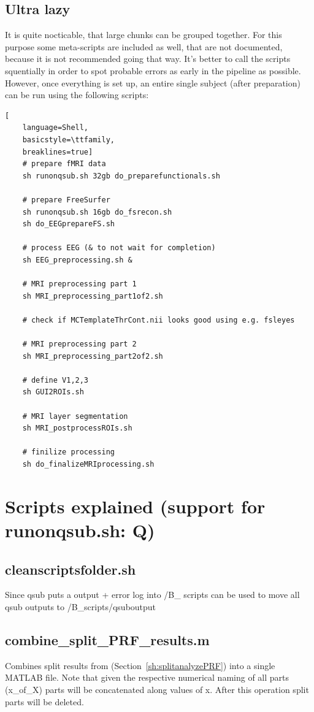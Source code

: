\documentclass[12pt,a4paper]{scrartcl}
\begin{document}
\subsection{Ultra lazy}
It is quite nocticable, that large chunks can be grouped together. For this purpose some meta-scripts are included as well, that are not documented, because it is not recommended going that way. It's better to call the scripts squentially in order to spot probable errors as early in the pipeline as possible. However, once everything is set up, an entire single subject (after preparation) can be run using the following scripts:
\begin{lstlisting}[
    language=Shell,
    basicstyle=\ttfamily,
    breaklines=true]
    # prepare fMRI data
    sh runonqsub.sh 32gb do_preparefunctionals.sh

    # prepare FreeSurfer
    sh runonqsub.sh 16gb do_fsrecon.sh
    sh do_EEGprepareFS.sh

    # process EEG (& to not wait for completion)
    sh EEG_preprocessing.sh &

    # MRI preprocessing part 1
    sh MRI_preprocessing_part1of2.sh

    # check if MCTemplateThrCont.nii looks good using e.g. fsleyes

    # MRI preprocessing part 2
    sh MRI_preprocessing_part2of2.sh

    # define V1,2,3
    sh GUI2ROIs.sh

    # MRI layer segmentation
    sh MRI_postprocessROIs.sh

    # finilize processing
    sh do_finalizeMRIprocessing.sh
\end{lstlisting}
\FloatBarrier

\section{Scripts explained (support for runonqsub.sh: Q)}
\label{sec:scriptsExplained}
\subsection{cleanscriptsfolder.sh}
\label{sh:clean}
Since qsub puts a output + error log into /B\_ scripts \texttt{} can be used to move all qsub outputs to /B\_scripts/qsuboutput\\

\subsection{combine\_split\_PRF\_results.m}
\label{m:combsplt}
Combines split results from \texttt{} (Section~\ref{sh:splitanalyzePRF}) into a single MATLAB file. Note that given the respective numerical naming of all parts (x\_of\_X) parts will be concatenated along values of x. After this operation split parts will be deleted.\\
\end{document}
